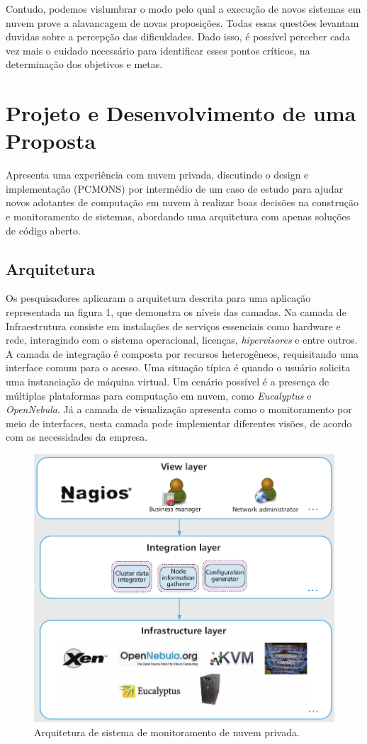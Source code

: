 \documentclass[12pt]{article}
\begin{document}
Contudo, podemos vislumbrar o modo pelo qual a execução de novos sistemas em nuvem prove a alavancagem de novas proposições. Todas essas questões levantam duvidas sobre a percepção das dificuldades. Dado isso, é possível perceber cada vez mais o cuidado necessário para identificar esses pontos críticos, na determinação dos objetivos e metas.

\section{Projeto e Desenvolvimento de uma Proposta}
\cite{westphall} Apresenta uma experiência com nuvem privada, discutindo o design e implementação (PCMONS) por intermédio de um caso de estudo para ajudar novos adotantes de computação em nuvem à realizar boas decisões na construção e monitoramento de sistemas, abordando uma arquitetura com apenas soluções de código aberto.

\subsection{Arquitetura}
Os pesquisadores aplicaram a arquitetura descrita para uma aplicação representada na figura 1, que demonstra os níveis das camadas. Na camada de Infraestrutura consiste em instalações de serviços essenciais como hardware e rede, interagindo com o sistema operacional, licenças, \emph{hipervisores} e entre outros. A camada de integração é composta por recursos heterogêneos, requisitando uma interface comum para o acesso. Uma situação típica é quando o usuário solicita uma instanciação de máquina virtual. Um cenário possível é a presença de múltiplas plataformas para computação em nuvem, como \emph{Eucalyptus} e \emph{OpenNebula}. Já a camada de visualização apresenta como o monitoramento por meio de interfaces, nesta camada pode implementar diferentes visões, de acordo com as necessidades da empresa.

\begin{figure}[H]
    \includegraphics[width=\linewidth]{arquitetura.png}
    \caption{Arquitetura de sistema de monitoramento de nuvem privada.}
\end{figure}
\end{document}
